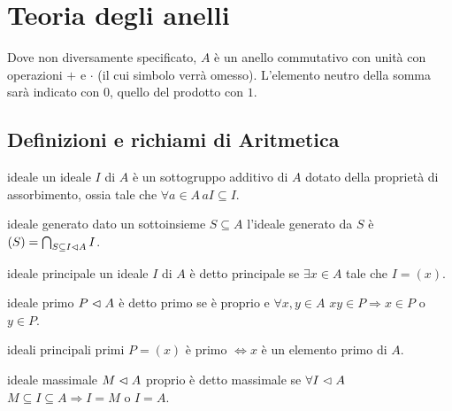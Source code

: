 \section{Teoria degli anelli}

Dove non diversamente specificato, $A$ è un anello commutativo con unità con operazioni $+$ e $\cdot$ (il cui simbolo verrà omesso). L'elemento neutro della somma sarà indicato con $0$, quello del prodotto con $1$.

\subsection{Definizioni e richiami di Aritmetica}

\begin{definition}{ideale}
    un ideale $I$ di $A$ è un sottogruppo additivo di $A$ dotato della proprietà di assorbimento, ossia tale che $\forall a \in A \, aI \subseteq I$.
\end{definition}
\begin{definition}{ideale generato}
    dato un sottoinsieme $S \subseteq A$ l'ideale generato da $S$ è $(S) = \bigcap_{S \subseteq I \vartriangleleft A} I$.
\end{definition}
\begin{definition}{ideale principale}
    un ideale $I$ di $A$ è detto principale se $\exists x \in A$ tale che $I = (x)$.
\end{definition}
\begin{definition}{ideale primo}
    $P \vartriangleleft A$ è detto primo se è proprio e $\forall x,y \in A$ $xy \in P \Rightarrow x \in P$ o $y\in P$.
\end{definition}
\begin{proposition}{ideali principali primi}
    $P = (x)$ è primo $\iff x$ è un elemento primo di $A$.
\end{proposition}
\begin{definition}{ideale massimale}
    $M \vartriangleleft A$ proprio è detto massimale se $\forall I \vartriangleleft A$ $M \subseteq I\subseteq A \Rightarrow I = M$ o $I = A$.
\end{definition}

